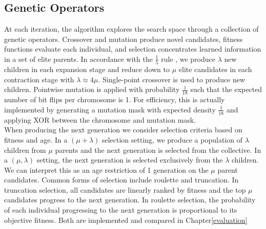 \subsection{Genetic Operators}
At each iteration, the algorithm explores the search space through a collection of genetic operators. Crossover and mutation produce novel candidates, fitness functions evaluate each individual, and selection concentrates learned information in a set of elite parents. In accordance with the $\frac{1}{5}$ rule , we produce $\lambda$ new children in each expansion stage and reduce down to $\mu$ elite candidates in each contraction stage with $\lambda \approx 4\mu$. Single-point crossover is used to produce new children. Pointwise mutation is applied with probability $\frac{1}{18}$ such that the expected number of bit flips per chromosome is 1. For efficiency, this is actually implemented by generating a mutation mask with expected density $\frac{1}{18}$ and applying XOR between the chromosome and mutation mask.\\

When producing the next generation we consider selection criteria based on fitness and age. In a $(\mu + \lambda)$ selection setting, we produce a population of $\lambda$ children from $\mu$ parents and the next generation is selected from the collective. In a $(\mu, \lambda)$ setting, the next generation is selected exclusively from the $\lambda$ children. We can interpret this as an age restriction of 1 generation on the $\mu$ parent candidates. Common forms of selection include roulette and truncation. In truncation selection, all candidates are linearly ranked by fitness and the top $\mu$ candidates progress to the next generation. In roulette selection, the probability of each individual progressing to the next generation is proportional to its objective fitness. Both are implemented and compared in Chapter\ref{evaluation}\\

